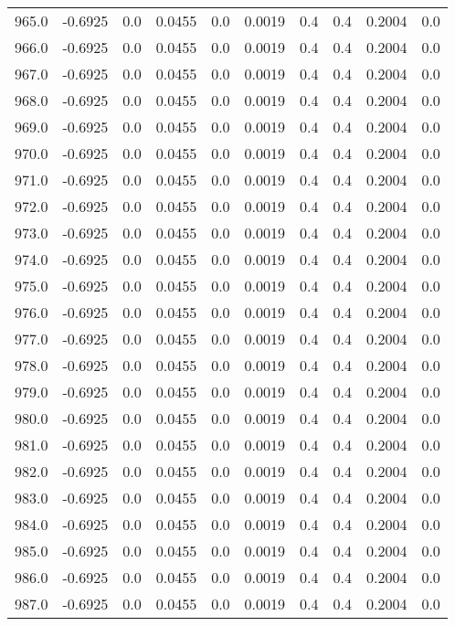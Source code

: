 \begin{longtable}{lrrrrrrrrr}
965.0 & -0.6925 & 0.0 & 0.0455 & 0.0 & 0.0019 & 0.4 & 0.4 & 0.2004 & 0.0 \\
966.0 & -0.6925 & 0.0 & 0.0455 & 0.0 & 0.0019 & 0.4 & 0.4 & 0.2004 & 0.0 \\
967.0 & -0.6925 & 0.0 & 0.0455 & 0.0 & 0.0019 & 0.4 & 0.4 & 0.2004 & 0.0 \\
968.0 & -0.6925 & 0.0 & 0.0455 & 0.0 & 0.0019 & 0.4 & 0.4 & 0.2004 & 0.0 \\
969.0 & -0.6925 & 0.0 & 0.0455 & 0.0 & 0.0019 & 0.4 & 0.4 & 0.2004 & 0.0 \\
970.0 & -0.6925 & 0.0 & 0.0455 & 0.0 & 0.0019 & 0.4 & 0.4 & 0.2004 & 0.0 \\
971.0 & -0.6925 & 0.0 & 0.0455 & 0.0 & 0.0019 & 0.4 & 0.4 & 0.2004 & 0.0 \\
972.0 & -0.6925 & 0.0 & 0.0455 & 0.0 & 0.0019 & 0.4 & 0.4 & 0.2004 & 0.0 \\
973.0 & -0.6925 & 0.0 & 0.0455 & 0.0 & 0.0019 & 0.4 & 0.4 & 0.2004 & 0.0 \\
974.0 & -0.6925 & 0.0 & 0.0455 & 0.0 & 0.0019 & 0.4 & 0.4 & 0.2004 & 0.0 \\
975.0 & -0.6925 & 0.0 & 0.0455 & 0.0 & 0.0019 & 0.4 & 0.4 & 0.2004 & 0.0 \\
976.0 & -0.6925 & 0.0 & 0.0455 & 0.0 & 0.0019 & 0.4 & 0.4 & 0.2004 & 0.0 \\
977.0 & -0.6925 & 0.0 & 0.0455 & 0.0 & 0.0019 & 0.4 & 0.4 & 0.2004 & 0.0 \\
978.0 & -0.6925 & 0.0 & 0.0455 & 0.0 & 0.0019 & 0.4 & 0.4 & 0.2004 & 0.0 \\
979.0 & -0.6925 & 0.0 & 0.0455 & 0.0 & 0.0019 & 0.4 & 0.4 & 0.2004 & 0.0 \\
980.0 & -0.6925 & 0.0 & 0.0455 & 0.0 & 0.0019 & 0.4 & 0.4 & 0.2004 & 0.0 \\
981.0 & -0.6925 & 0.0 & 0.0455 & 0.0 & 0.0019 & 0.4 & 0.4 & 0.2004 & 0.0 \\
982.0 & -0.6925 & 0.0 & 0.0455 & 0.0 & 0.0019 & 0.4 & 0.4 & 0.2004 & 0.0 \\
983.0 & -0.6925 & 0.0 & 0.0455 & 0.0 & 0.0019 & 0.4 & 0.4 & 0.2004 & 0.0 \\
984.0 & -0.6925 & 0.0 & 0.0455 & 0.0 & 0.0019 & 0.4 & 0.4 & 0.2004 & 0.0 \\
985.0 & -0.6925 & 0.0 & 0.0455 & 0.0 & 0.0019 & 0.4 & 0.4 & 0.2004 & 0.0 \\
986.0 & -0.6925 & 0.0 & 0.0455 & 0.0 & 0.0019 & 0.4 & 0.4 & 0.2004 & 0.0 \\
987.0 & -0.6925 & 0.0 & 0.0455 & 0.0 & 0.0019 & 0.4 & 0.4 & 0.2004 & 0.0 \\

\end{longtable}
